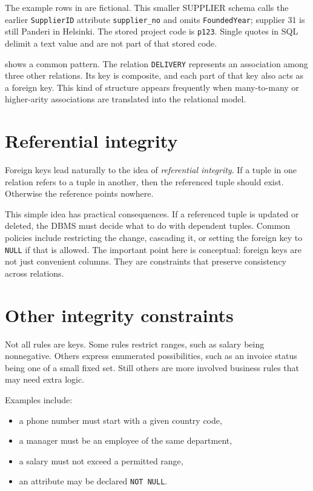 \documentclass[11pt,a4paper,openany]{book}
\begin{document}
The example rows in  are fictional. This smaller
SUPPLIER schema calls the earlier \texttt{SupplierID} attribute
\texttt{supplier\_no} and omits \texttt{FoundedYear}; supplier 31 is still
Panderi in Helsinki. The stored project code is \texttt{p123}. Single quotes
in SQL delimit a text value and are not part of that stored code.

 shows a common pattern. The relation \texttt{DELIVERY} represents an association among three other relations. Its key is composite, and each part of that key also acts as a foreign key. This kind of structure appears frequently when many-to-many or higher-arity associations are translated into the relational model.

\section{Referential integrity}
Foreign keys lead naturally to the idea of \emph{referential integrity}. If a tuple in one relation refers to a tuple in another, then the referenced tuple should exist. Otherwise the reference points nowhere.

This simple idea has practical consequences. If a referenced tuple is updated or deleted, the DBMS must decide what to do with dependent tuples. Common policies include restricting the change, cascading it, or setting the foreign key to \texttt{NULL} if that is allowed. The important point here is conceptual: foreign keys are not just convenient columns. They are constraints that preserve consistency across relations.

\section{Other integrity constraints}
Not all rules are keys. Some rules restrict ranges, such as salary being nonnegative. Others express enumerated possibilities, such as an invoice status being one of a small fixed set. Still others are more involved business rules that may need extra logic.

Examples include:
\begin{itemize}
\item a phone number must start with a given country code,
\item a manager must be an employee of the same department,
\item a salary must not exceed a permitted range,
\item an attribute may be declared \texttt{NOT NULL}.
\end{itemize}
\end{document}
